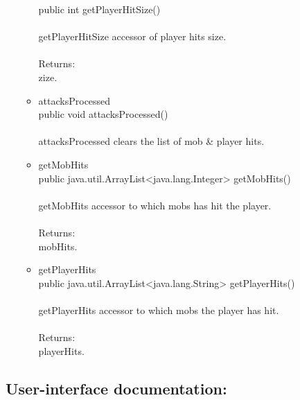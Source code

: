 \documentclass[letterpaper]{article}
\begin{document}
\begin{itemize}
\begin{itemize}
														public int getPlayerHitSize() \\ \\
														getPlayerHitSize accessor of player hits size. \\ \\
														Returns: \\ 
														zize.\\
												\item	attacksProcessed \\
														public void attacksProcessed() \\ \\
														attacksProcessed clears the list of mob \& player hits. \\
												\item	getMobHits \\
														public java.util.ArrayList<java.lang.Integer> getMobHits() \\ \\
														getMobHits accessor to which mobs has hit the player. \\ \\
														Returns: \\
														mobHits. \\
												\item	getPlayerHits \\
														public java.util.ArrayList<java.lang.String> getPlayerHits() \\ \\
														getPlayerHits accessor to which mobs the player has hit. \\ \\
														Returns: \\
														playerHits. \\
											\end{itemize}
								\end{itemize}
					
					\vspace{0.2in}
					\subsection*{User-interface documentation:}
					\vspace{0.1in}
					
\end{document}
